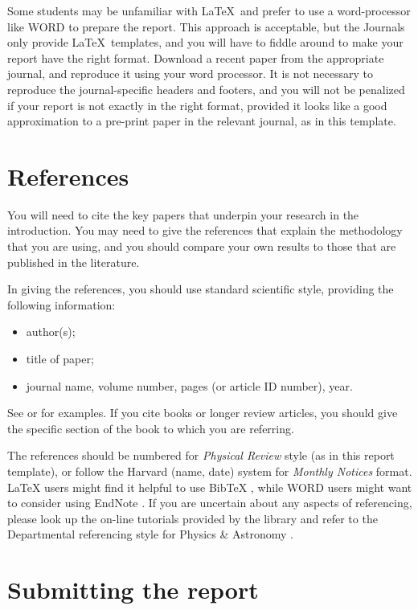 \documentclass[aps,pra,twocolumn]{revtex4-2}
\begin{document}
 Some students may be unfamiliar with  \LaTeX\ and prefer to use a word-processor like WORD to prepare the report. This approach is acceptable, but the Journals only provide \LaTeX\ templates, and you will have to fiddle around to make your report have the right format. Download a recent paper from the appropriate journal, and reproduce it using your word processor. It is not necessary to reproduce the journal-specific headers and footers, and you will not be penalized if your report is not exactly in the right format, provided it looks like a good approximation to a pre-print paper in the relevant journal, as in this template. 








\section{References}
\label{sec:refs}


 You will need to cite the key papers that underpin your research in the introduction. You may need to give the references that explain the methodology that you are using, and you should  compare your own results to those that are published in the literature.

In giving the references, you should use standard scientific style, providing the following information: 
\begin{itemize}
\item author(s);
\item title of paper;
\item journal name, volume number, pages (or article ID number), year.
\end{itemize}
See \cite{Dyson} or  \cite{Einstein} for examples. If you cite books \cite{good book} or longer review articles, you should give the specific section of the book to which you are referring. 

The references should be numbered for \textit{Physical Review} style (as in this report template), or follow the Harvard (name, date) system for  \textit{Monthly Notices} format. LaTeX users might find it helpful to use BibTeX \cite{BibteX}, while WORD users might want to consider using EndNote \cite{Endnote}.
If you are uncertain about any aspects of referencing, please look up the on-line tutorials provided by the library and refer to the Departmental referencing style for Physics \& Astronomy \cite{Referencing}. 


\section{Submitting the report}
\end{document}
